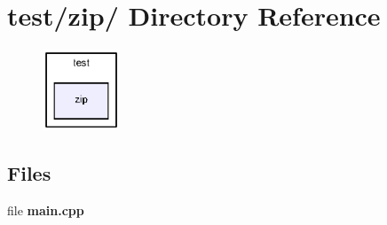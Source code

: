 \section{test/zip/ Directory Reference}
\label{dir_ee4c44d0388c12031fb738965cf777e7}


\nopagebreak
\begin{figure}[H]
\begin{center}
\leavevmode
\includegraphics[width=65pt]{dir_ee4c44d0388c12031fb738965cf777e7_dep}
\end{center}
\end{figure}
\subsection*{Files}
\begin{CompactItemize}
\item 
file \textbf{main.cpp}
\end{CompactItemize}
